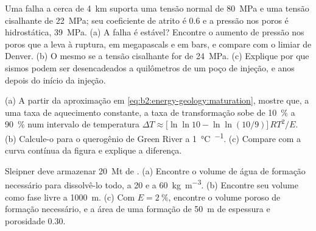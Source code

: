 \begin{exercise}[$\star\star\star$]\label{exo:b2:energy-geology:10}
Uma falha a cerca de \qty{4}{km} suporta uma tensão normal de \qty{80}{MPa} e uma tensão cisalhante de
\qty{22}{MPa}; seu coeficiente de atrito é 0.6 e a pressão nos poros é hidrostática,
\qty{39}{MPa}. (a) A falha é estável? Encontre o aumento de pressão nos poros que a leva à ruptura, em
megapascals e em bars, e compare com o limiar de Denver. (b) O mesmo se a tensão cisalhante for de
\qty{24}{MPa}. (c) Explique por que sismos podem ser desencadeados a quilômetros de um poço de injeção,
e anos depois do início da injeção.
\end{exercise}

\begin{exercise}[$\star\star\star$]\label{exo:b2:energy-geology:11}
(a) A partir da aproximação em \eqref{eq:b2:energy-geology:maturation}, mostre que, a uma taxa de
aquecimento constante, a taxa de transformação sobe de \qty{10}{\percent} a \qty{90}{\percent} num
intervalo de temperatura $\Delta T \approx \bigl[\ln\ln 10 - \ln\ln(10/9)\bigr]\,RT^2/E$. (b) Calcule-o
para o querogênio de Green River a \qty{1}{\celsius\per\Myr}. (c) Compare com a curva contínua da
figura e explique a diferença.
\end{exercise}

\begin{exercise}[$\star\star\star$]\label{exo:b2:energy-geology:12}
Sleipner deve armazenar \qty{20}{Mt} de . (a) Encontre o volume de água de formação necessário para
dissolvê-lo todo, a 20 e a \qty{60}{kg.m^{-3}}. (b) Encontre seu volume como fase livre a
\qty{1000}{m}. (c) Com $E = \qty{2}{\percent}$, encontre o volume poroso de formação necessário, e
a área de uma formação de \qty{50}{m} de espessura e porosidade 0.30.
\end{exercise}

